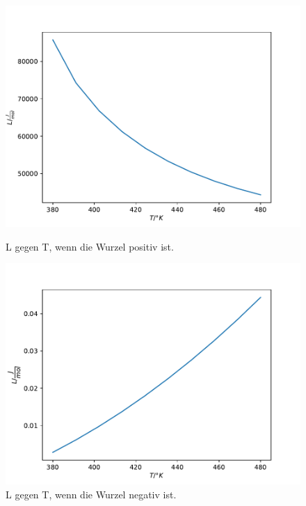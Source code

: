 \begin{figure}[H]
    \centering
    \includegraphics[width=\textwidth]{plot3.pdf}
    \label{fig:LT_pos}
    \caption{L gegen T, wenn die Wurzel positiv ist.}
\end{figure}
\begin{figure}[H]
    \centering
    \includegraphics[width=\textwidth]{plot4.pdf}
    \caption{L gegen T, wenn die Wurzel negativ ist.}
\end{figure}
